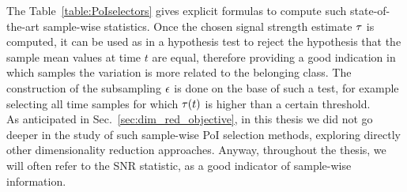 The Table~\ref{table:PoIselectors} gives explicit formulas to compute such state-of-the-art sample-wise statistics. Once the chosen signal strength estimate $\tau$ is computed, it can be used as in a hypothesis test to reject the hypothesis that the sample mean values at time $t$ are equal, therefore providing a good indication in which samples the variation is more related to the belonging class. The construction of the subsampling $\epsilon$ is done on the base of such a test, for example selecting all time samples for which $\tau(t)$ is higher than a certain threshold. \\

As anticipated in Sec.~\ref{sec:dim_red_objective}, in this thesis we did not go deeper in the study of such sample-wise PoI selection methods, exploring directly other dimensionality reduction approaches. Anyway, throughout the thesis, we will often refer to the SNR statistic, as a good indicator of sample-wise information.

